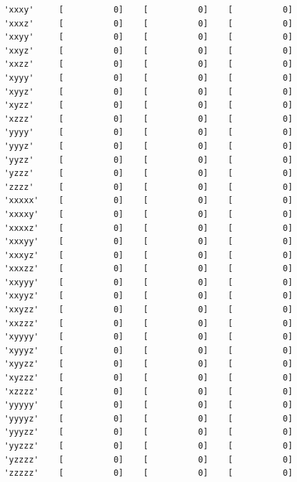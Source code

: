 \documentclass[onecolumn,11pt]{article}
\begin{document}
\begin{table}[where!]
\begin{center}
{\begin{verbatim}
    'xxxy'     [          0]    [          0]    [          0]
    'xxxz'     [          0]    [          0]    [          0]
    'xxyy'     [          0]    [          0]    [          0]
    'xxyz'     [          0]    [          0]    [          0]
    'xxzz'     [          0]    [          0]    [          0]
    'xyyy'     [          0]    [          0]    [          0]
    'xyyz'     [          0]    [          0]    [          0]
    'xyzz'     [          0]    [          0]    [          0]
    'xzzz'     [          0]    [          0]    [          0]
    'yyyy'     [          0]    [          0]    [          0]
    'yyyz'     [          0]    [          0]    [          0]
    'yyzz'     [          0]    [          0]    [          0]
    'yzzz'     [          0]    [          0]    [          0]
    'zzzz'     [          0]    [          0]    [          0]
    'xxxxx'    [          0]    [          0]    [          0]
    'xxxxy'    [          0]    [          0]    [          0]
    'xxxxz'    [          0]    [          0]    [          0]
    'xxxyy'    [          0]    [          0]    [          0]
    'xxxyz'    [          0]    [          0]    [          0]
    'xxxzz'    [          0]    [          0]    [          0]
    'xxyyy'    [          0]    [          0]    [          0]
    'xxyyz'    [          0]    [          0]    [          0]
    'xxyzz'    [          0]    [          0]    [          0]
    'xxzzz'    [          0]    [          0]    [          0]
    'xyyyy'    [          0]    [          0]    [          0]
    'xyyyz'    [          0]    [          0]    [          0]
    'xyyzz'    [          0]    [          0]    [          0]
    'xyzzz'    [          0]    [          0]    [          0]
    'xzzzz'    [          0]    [          0]    [          0]
    'yyyyy'    [          0]    [          0]    [          0]
    'yyyyz'    [          0]    [          0]    [          0]
    'yyyzz'    [          0]    [          0]    [          0]
    'yyzzz'    [          0]    [          0]    [          0]
    'yzzzz'    [          0]    [          0]    [          0]
    'zzzzz'    [          0]    [          0]    [          0]
\end{verbatim}
}
\end{center}
\end{table}


\end{document}
